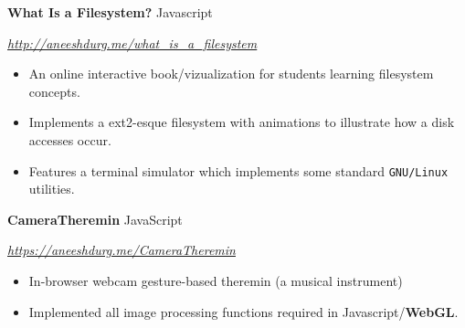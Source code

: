 \documentclass[paper=a4,fontsize=11pt]{scrartcl} %
\newcommand{\sepspace}{\vspace*{1em}}		%
\newcommand{\EducationEntry}[4]{
		\noindent \textbf{#1}     %
			\hfill#2 \par  %
		\noindent \textit{#3} \par        %
		\noindent\hangafter=0 \small #4 %
		\normalsize \par}
\begin{document}
\begin{minipage}[t]{0.75\textwidth}
\EducationEntry{What Is a Filesystem?}{Javascript}{\url{http://aneeshdurg.me/what_is_a_filesystem}}{
\begin{itemize}
\item An online interactive book/vizualization for students learning filesystem concepts.
\item Implements a ext2-esque filesystem with animations to illustrate how a disk accesses occur.
\item Features a terminal simulator which implements some standard \texttt{GNU/Linux} utilities.%
\end{itemize}
}


\EducationEntry{CameraTheremin}{JavaScript}{\url{https://aneeshdurg.me/CameraTheremin}}{
\begin{itemize}
\item In-browser webcam gesture-based theremin (a musical instrument)
\item Implemented all image processing functions required in Javascript/\textbf{WebGL}.
\end{itemize}
}



\end{minipage}
\end{document}

